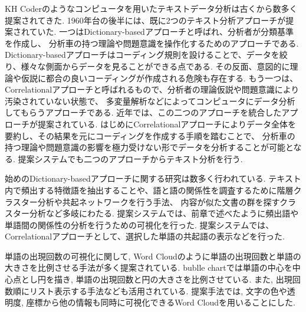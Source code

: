 \documentclass[syuuron]{kuee}
\begin{document}
		KH Coderのようなコンピュータを用いたテキストデータ分析は古くから数多く提案されてきた. 
		1960年台の後半には、既に2つのテキスト分析アプローチが提案されていた. 
		一つはDictionary-basedアプローチと呼ばれ、分析者が分類基準を作成し、
		分析車の持つ理論や問題意識を操作化するためのアプローチである. 
		Dictionary-basedアプローチはコーディング規則を設けることで、データを絞り、様々な側面からデータを見ることができる点である. 
		その反面、意図的に理論や仮説に都合の良いコーディングが作成される危険も存在する. 
		もう一つは、Correlationalアプローチと呼ばれるもので、分析者の理論仮説や問題意識により汚染されていない状態で、
		多変量解析などによってコンピュータにデータ分析してもらうアプローチである. 
		近年では、この二つのアプローチを統合したアプローチが提案されている\cite{kh1}. 
		はじめにCorrelationalアプローチによりデータ全体を要約し、その結果を元にコーディングを作成する手順を踏むことで、
		分析車の持つ理論や問題意識の影響を極力受けない形でデータを分析することが可能となる. 
		提案システムでも二つのアプローチからテキスト分析を行う. 
		
		始めのDictionary-basedアプローチに関する研究は数多く行われている. 
		テキスト内で頻出する特徴語を抽出することや、語と語の関係性を調査するために階層クラスター分析や共起ネットワークを行う手法、
		内容が似た文書の群を探すクラスター分析など多岐にわたる. 
		提案システムでは、前章で述べたように頻出語や単語間の関係性の分析を行うための可視化を行った. 
		提案システムでは、Correlationalアプローチとして、選択した単語の共起語の表示などを行った. 
		
		単語の出現回数の可視化に関して, Word Cloudのように単語の出現回数と単語の大きさを比例させる手法が多く提案されている. 
		bublle chartでは単語の中心を中心点とし円を描き, 単語の出現回数と円の大きさを比例させている. 
		また, 出現回数順にリスト表示する手法なども活用されている. 
		提案手法では, 文字の色や透明度, 座標から他の情報も同時に可視化できるWord Cloudを用いることにした. 
		
\end{document}
